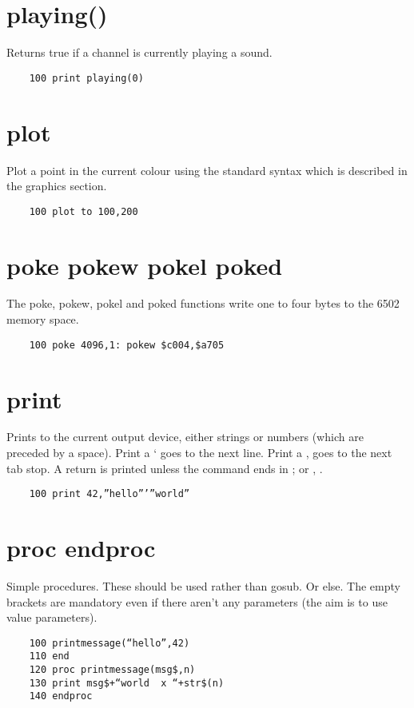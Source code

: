 \section*{playing()}
Returns true if a channel is currently playing a sound.
\example{}
\begin{verbatim}
	100 print playing(0)
\end{verbatim}

\section*{plot}
Plot a point in the current colour using the standard syntax which is described in the graphics section.
\example{}
\begin{verbatim}
	100 plot to 100,200
\end{verbatim}

\section*{poke pokew pokel poked}
The poke, pokew, pokel and poked functions write one to four bytes to the 6502 memory space.
\example{}
\begin{verbatim}
	100 poke 4096,1: pokew $c004,$a705
\end{verbatim}

\section*{print}
Prints to the current output device, either strings or numbers (which are preceded by a space). Print a ‘ goes to the next line. Print a , goes to the next tab stop. A return is printed unless the command ends in ; or , . 
\example{}
\begin{verbatim}
	100 print 42,”hello”’”world”
\end{verbatim}

\section*{proc endproc}
Simple procedures. These should be used rather than gosub. Or else.  The empty brackets are mandatory even if there aren’t any parameters (the aim is to use value parameters).
\example{}
\begin{verbatim}
	100 printmessage(“hello”,42)
	110 end
	120 proc printmessage(msg$,n)
	130 print msg$+“world  x “+str$(n)
	140 endproc
\end{verbatim}

